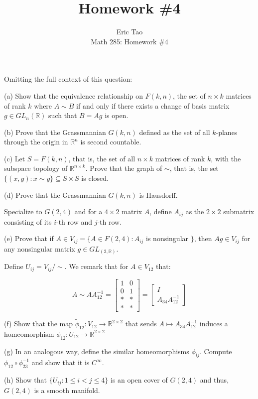 \documentclass[10pt]{article}
\newenvironment{problem}[2][]{\begin{trivlist}
\item[\hskip \labelsep {\bfseries #1}\hskip \labelsep {\bfseries #2.}]}{\end{trivlist}}
\begin{document}
 
\title{Homework \#4}
\author{Eric Tao\\
Math 285: Homework \#4}
\maketitle

\begin{problem}{Question 1}

Omitting the full context of this question:

(a) Show that the equivalence relationship on $F(k,n)$, the set of $n \times k$ matrices of rank $k$ where $A \sim B$ if and only if there exists a change of basis matrix $g \in GL_n(\mathbb{R})$ such that $B = Ag$ is open.

(b) Prove that the Grassmannian $G(k,n)$ defined as the set of all $k$-planes through the origin in $\mathbb{R}^n$ is second countable.

(c) Let $S = F(k,n)$, that is, the set of all $n \times k$ matrices of rank $k$, with the subspace topology of $\mathbb{R}^{n \times k}$. Prove that the graph of $\sim$, that is, the set $\{ (x,y) : x \sim y \} \subseteq S \times S$ is closed.

(d) Prove that the Grassmannian $G(k,n)$ is Hausdorff.

Specialize to $G(2,4)$ and for a $4 \times 2$ matrix $A$, define $A_{ij}$ as the $2 \times 2$ submatrix consisting of its $i$-th row and $j$-th row.

(e) Prove that if $A \in V_{ij} = \{ A \in F(2,4) : A_{ij}$ is nonsingular $\}$, then $Ag \in V_{ij}$ for any nonsingular matrix $g \in GL_(2, \mathbb{R})$. 

Define $U_{ij} = V_{ij} / \sim$. We remark that for $A \in V_{12}$ that:

$$ A \sim A A^{-1}_{12} = \begin{bmatrix} 1 & 0 \\ 0 & 1 \\ * &* \\ *&*\end{bmatrix} = \begin{bmatrix} I \\ A_{34}A^{-1}_{12} \end{bmatrix} $$

(f) Show that the map $\tilde{\phi}_{12}: V_{12} \to \mathbb{R}^{2 \times 2}$ that sends $A \mapsto A_{34} A^{-1}_{12}$ induces a homeomorphism $\phi_{12}: U_{12}\to\mathbb{R}^{2\times 2} $

(g) In an analogous way, define the similar homeomorphisms $\phi_{ij}$. Compute $\phi_{12} \circ \phi_{23}^{-1}$ and show that it is $C^\infty$. 

(h) Show that $\{ U_{ij} : 1 \leq i < j \leq 4 \}$ is an open cover of $G(2,4)$ and thus, $G(2,4)$ is a smooth manifold.


\end{problem}
\end{document}
